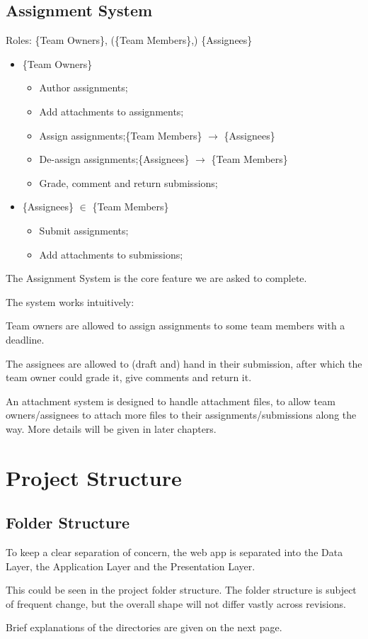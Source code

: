 \documentclass[12pt]{report}
\newcommand{\n}{\par}
\newcommand{\br}{\vspace{1 em}\n}
\begin{document}
\subsection{Assignment System}\label{overview.project-objectives.assignment-system}
Roles: \{Team Owners\}, (\{Team Members\},) \{Assignees\}\n
\begin{itemize}
	\item \{Team Owners\}
	      \begin{itemize}
		      \item Author assignments;
		      \item Add attachments to assignments;
		      \item Assign assignments;\null\hfill \{Team Members\} $\rightarrow$ \{Assignees\}
		      \item De-assign assignments;\null\hfill \{Assignees\} $\rightarrow$ \{Team Members\}
		      \item Grade, comment and return submissions;
	      \end{itemize}
	\item \{Assignees\} $\in$ \{Team Members\}
	      \begin{itemize}
		      \item Submit assignments;
		      \item Add attachments to submissions;
	      \end{itemize}
\end{itemize}\n
The Assignment System is the core feature we are asked to complete.\n
The system works intuitively:\n
Team owners are allowed to assign assignments to some team members with a deadline.\n
The assignees are allowed to (draft and) hand in their submission,
after which the team owner could grade it, give comments and return it.
\br
An attachment system is designed to handle attachment files, to allow team owners/assignees
to attach more files to their assignments/submissions along the way.
More details will be given in later chapters.
\newpage

\section{Project Structure}\label{overview.project-structure}

\subsection{Folder Structure}\label{overview.project-structure.folder-structure}
To keep a clear separation of concern, the web app is separated into
the Data Layer, the Application Layer and the Presentation Layer.
\br
This could be seen in the project folder structure.
The folder structure is subject of frequent change, but the overall shape will not differ vastly across revisions.
\br
{}
\vspace{3 em}\n
Brief explanations of the directories are given on the next page.
\newpage
\end{document}
